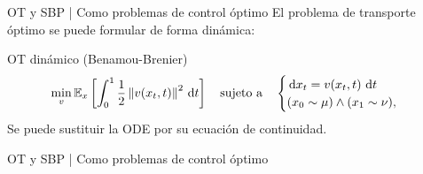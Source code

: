 \documentclass[aspectratio=43, 10pt]{beamer} %
\begin{document}
\begin{frame}{OT y SBP | Como problemas de control óptimo}
    El problema de transporte óptimo se puede formular de forma dinámica:
    \begin{block}{OT dinámico (Benamou-Brenier)}
        \begin{equation*}
            \min_{v} \mathbb{E}_{x}\left[\int_0^1 \frac{1}{2}\left\lVert v(x_t,t) \right\rVert^2 \,\operatorname{d}\! t\right]
            \quad\text{sujeto a}\quad
            \begin{cases}
                \,\operatorname{d}\! x_t = v(x_t,t) \,\operatorname{d}\! t \\
                (x_0\sim\mu) \wedge (x_1\sim\nu),
            \end{cases}
        \end{equation*}
        Se puede sustituir la ODE por su ecuación de continuidad.
    \end{block}
\end{frame}

\begin{frame}{OT y SBP | Como problemas de control óptimo}
\end{frame}
\end{document}
